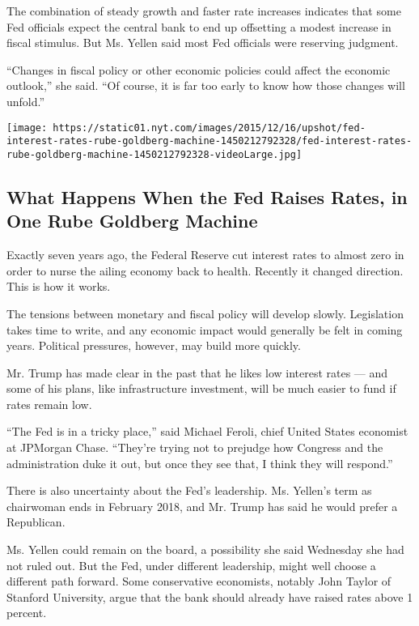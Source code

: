 The combination of steady growth and faster rate increases indicates
that some Fed officials expect the central bank to end up offsetting a
modest increase in fiscal stimulus. But Ms. Yellen said most Fed
officials were reserving judgment.

``Changes in fiscal policy or other economic policies could affect the
economic outlook,'' she said. ``Of course, it is far too early to know
how those changes will unfold.''

\href{https://www.nytimes.com/interactive/2015/12/16/upshot/fed-interest-rates-rube-goldberg-machine.html}{}

\texttt{[image: https://static01.nyt.com/images/2015/12/16/upshot/fed-interest-rates-rube-goldberg-machine-1450212792328/fed-interest-rates-rube-goldberg-machine-1450212792328-videoLarge.jpg]}

\hypertarget{what-happens-when-the-fed-raises-rates-in-one-rube-goldberg-machine}{%
\subsection{What Happens When the Fed Raises Rates, in One Rube Goldberg
Machine}\label{what-happens-when-the-fed-raises-rates-in-one-rube-goldberg-machine}}

Exactly seven years ago, the Federal Reserve cut interest rates to
almost zero in order to nurse the ailing economy back to health.
Recently it changed direction. This is how it works.

The tensions between monetary and fiscal policy will develop slowly.
Legislation takes time to write, and any economic impact would generally
be felt in coming years. Political pressures, however, may build more
quickly.

Mr. Trump has made clear in the past that he likes low interest rates
--- and some of his plans, like infrastructure investment, will be much
easier to fund if rates remain low.

``The Fed is in a tricky place,'' said Michael Feroli, chief United
States economist at JPMorgan Chase. ``They're trying not to prejudge how
Congress and the administration duke it out, but once they see that, I
think they will respond.''

There is also uncertainty about the Fed's leadership. Ms. Yellen's term
as chairwoman ends in February 2018, and Mr. Trump has said he would
prefer a Republican.

Ms. Yellen could remain on the board, a possibility she said Wednesday
she had not ruled out. But the Fed, under different leadership, might
well choose a different path forward. Some conservative economists,
notably John Taylor of Stanford University, argue that the bank should
already have raised rates above 1 percent.

